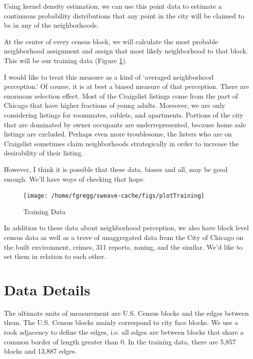 \documentclass[12pt,letter]{article}\usepackage[]{graphicx}\usepackage[]{color}
\newenvironment{knitrout}{}{} %
\begin{document}
Using kernel density estimation, we can use this point data to
estimate a continuous probability distributions that any point in the
city will be claimed to be in any of the neighborhoods. 

At the center of every census block, we will calculate the most
probable neighborhood assignment and assign that most likely
neighborhood to that block. This will be our training data (Figure
\ref{fig:training}).

I would like to treat this measure as a kind of `averaged neighborhood
perception.' Of course, it is at best a biased measure of that
perception. There are enormous selection effect. Most of the
Craigslist listings come from the part of Chicago that have higher
fractions of young adults. Moreover, we are only considering listings
for roommates, sublets, and apartments. Portions of the city that are
dominated by owner occupants are underrepresented, because home sale
listings are excluded. Perhaps even more troublesome, the listers who
are on Craigslist sometimes claim neighborhoods strategically in order
to increase the desirability of their listing.

However, I think it is possible that these data, biases and all, may
be good enough. We'll have ways of checking that hope.


\begin{figure}
\begin{knitrout}
\color{fgcolor}

{\centering \texttt{[image: /home/fgregg/sweave-cache/figs/plotTraining]} 

}



\end{knitrout}

\caption{Training Data}
\label{fig:training}
\end{figure}

In addition to these data about neighborhood perception, we also have
block level census data as well as a trove of unaggregated data from
the City of Chicago on the built environment, crimes, 311 reports,
zoning, and the similar. We'd like to set them in relation to each
other.

\section*{Data Details}
The ultimate units of measurement are U.S. Census blocks and the edges
between them. The U.S. Census blocks mainly correspond to city face blocks.
We use a rook adjacency to define the edges, i.e. all edges are between blocks
that share a common border of length greater than 0. In the training data,
there are 5,857 blocks and
  13,887 edges.
\end{document}
